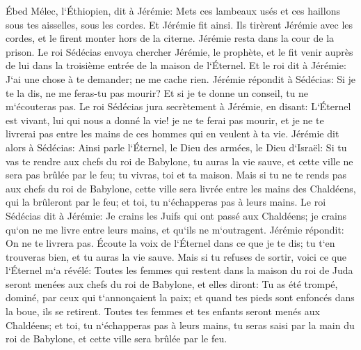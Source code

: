 \verse Ébed Mélec, l`Éthiopien, dit à Jérémie: Mets ces lambeaux usés et ces haillons sous tes aisselles, sous les cordes. Et Jérémie fit ainsi. 
\verse Ils tirèrent Jérémie avec les cordes, et le firent monter hors de la citerne. Jérémie resta dans la cour de la prison. 
\verse Le roi Sédécias envoya chercher Jérémie, le prophète, et le fit venir auprès de lui dans la troisième entrée de la maison de l`Éternel. Et le roi dit à Jérémie: J`ai une chose à te demander; ne me cache rien. 
\verse Jérémie répondit à Sédécias: Si je te la dis, ne me feras-tu pas mourir? Et si je te donne un conseil, tu ne m`écouteras pas. 
\verse Le roi Sédécias jura secrètement à Jérémie, en disant: L`Éternel est vivant, lui qui nous a donné la vie! je ne te ferai pas mourir, et je ne te livrerai pas entre les mains de ces hommes qui en veulent à ta vie. 
\verse Jérémie dit alors à Sédécias: Ainsi parle l`Éternel, le Dieu des armées, le Dieu d`Israël: Si tu vas te rendre aux chefs du roi de Babylone, tu auras la vie sauve, et cette ville ne sera pas brûlée par le feu; tu vivras, toi et ta maison. 
\verse Mais si tu ne te rends pas aux chefs du roi de Babylone, cette ville sera livrée entre les mains des Chaldéens, qui la brûleront par le feu; et toi, tu n`échapperas pas à leurs mains. 
\verse Le roi Sédécias dit à Jérémie: Je crains les Juifs qui ont passé aux Chaldéens; je crains qu`on ne me livre entre leurs mains, et qu`ils ne m`outragent. 
\verse Jérémie répondit: On ne te livrera pas. Écoute la voix de l`Éternel dans ce que je te dis; tu t`en trouveras bien, et tu auras la vie sauve. 
\verse Mais si tu refuses de sortir, voici ce que l`Éternel m`a révélé: 
\verse Toutes les femmes qui restent dans la maison du roi de Juda seront menées aux chefs du roi de Babylone, et elles diront: Tu as été trompé, dominé, par ceux qui t`annonçaient la paix; et quand tes pieds sont enfoncés dans la boue, ils se retirent. 
\verse Toutes tes femmes et tes enfants seront menés aux Chaldéens; et toi, tu n`échapperas pas à leurs mains, tu seras saisi par la main du roi de Babylone, et cette ville sera brûlée par le feu. 

